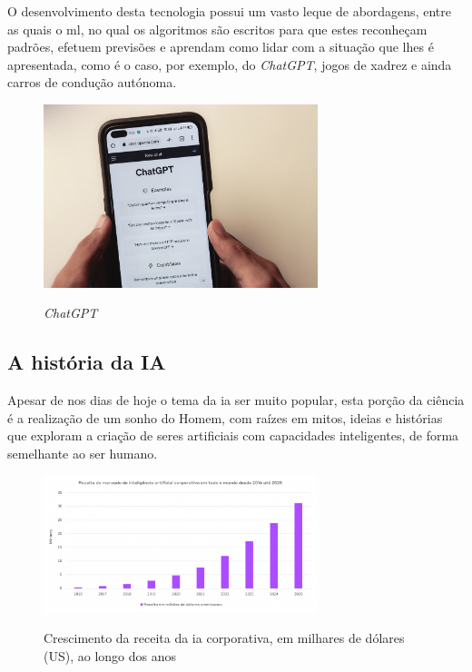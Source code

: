 \documentclass{report}
\begin{document}
	O desenvolvimento desta tecnologia possui um vasto leque de abordagens, entre as quais o \ac{ml}, no qual os algoritmos são escritos para que estes reconheçam padrões, efetuem previsões e aprendam como lidar com a situação que lhes é apresentada, como é o caso, por exemplo, do \textit{ChatGPT}, jogos de xadrez e ainda carros de condução autónoma.
	
\begin{figure}[H]
\caption{\textit{ChatGPT}}
\centering
\includegraphics[width=8cm]{imagens/chatgpt.jpg}
\label{chatgpt}
\end{figure}

\nocite{chatgpt}

\subsection{A história da IA}
\label{subsec.a_historia_da_ia}

	Apesar de nos dias de hoje o tema da \ac{ia} ser muito popular, esta porção da ciência é a realização de um sonho do Homem, com raízes em mitos, ideias e histórias que exploram a criação de seres artificiais com capacidades inteligentes, de forma semelhante ao ser humano.
	
\begin{figure}[H]
\caption{Crescimento da receita da \ac{ia} corporativa, em milhares de dólares (US), ao longo dos anos}
\centering
\includegraphics[width=8cm]{imagens/grafico3.png}
\label{Crescimento da receita de IA em milhares de dolares ao longo dos anos}
\end{figure}
\end{document}
